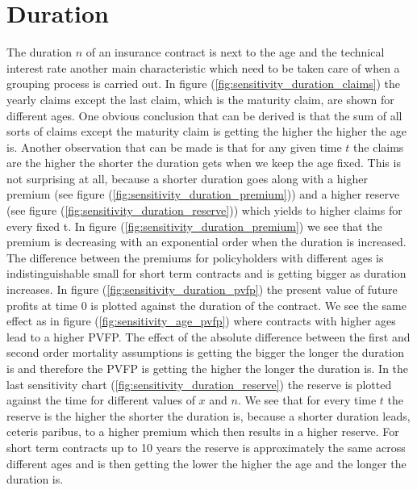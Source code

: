 \section{Duration}
\label{sec:duration}
The duration $n$ of an insurance contract is next to the age and the technical interest rate another main characteristic which need to be taken care of when a grouping process is carried out. In figure (\ref{fig:sensitivity_duration_claims}) the yearly claims except the last claim, which is the maturity claim, are shown for different ages. One obvious conclusion that can be derived is that the sum of all sorts of claims except the maturity claim is getting the higher the higher the age is. Another observation that can be made is that for any given time $t$ the claims are the higher the shorter the duration gets when we keep the age fixed. This is not surprising at all, because a shorter duration goes along with a higher premium (see figure (\ref{fig:sensitivity_duration_premium})) and a higher reserve (see figure (\ref{fig:sensitivity_duration_reserve})) which yields to higher claims for every fixed t.  In figure (\ref{fig:sensitivity_duration_premium}) we see that the premium is decreasing with an exponential order when the duration is increased. The difference between the premiums for policyholders with different ages is indistinguishable small for short term contracts and is getting bigger as duration increases. In figure (\ref{fig:sensitivity_duration_pvfp}) the present  value of future profits at time 0 is plotted against the duration of the contract. We see the same effect as in figure (\ref{fig:sensitivity_age_pvfp}) where contracts with higher ages lead to a higher PVFP. The effect of the absolute difference between the first and second order mortality assumptions is getting the bigger the longer the duration is and therefore the PVFP is getting the higher the longer the duration is. In the last sensitivity chart (\ref{fig:sensitivity_duration_reserve}) the reserve is plotted against the time for different values of $x$ and $n$. We see that for every time $t$ the reserve is the higher the shorter the duration is, because a shorter duration leads, ceteris paribus, to a higher premium which then results in a higher reserve. For short term contracts up to 10 years the reserve is approximately the same across different ages and is then getting the lower the higher the age and the  longer the duration is.
